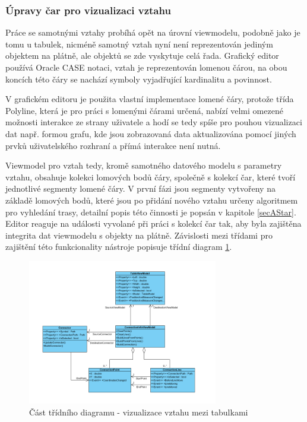 \documentclass[czech,bachelor,public,dept460,male,oneside]{diploma}
\begin{document}
		\subsubsection{Úpravy čar pro vizualizaci vztahu}
		Práce se samotnými vztahy probíhá opět na úrovní viewmodelu, podobně jako je tomu u tabulek, nicméně samotný vztah nyní není reprezentován jediným objektem na plátně, ale objektů se zde vyskytuje celá řada. Grafický editor používá Oracle CASE notaci, vztah je reprezentován lomenou čárou, na obou koncích této čáry se nachází symboly vyjadřující kardinalitu a povinnost. 
		
		V grafickém editoru je použita vlastní implementace lomené čáry, protože třída Polyline, která je pro práci s lomenými čárami určená, nabízí velmi omezené možnosti interakce ze strany uživatele a hodí se tedy spíše pro pouhou vizualizaci dat např. formou grafu, kde jsou zobrazovaná data aktualizována pomocí jiných prvků uživatelského rozhraní a přímá interakce není nutná.
		
		Viewmodel pro vztah tedy, kromě samotného datového modelu s parametry vztahu, obsahuje kolekci lomových bodů čáry, společně s kolekcí čar, které tvoří jednotlivé segmenty lomené čáry. V první fázi jsou segmenty vytvořeny na základě lomových bodů, které jsou po přidání nového vztahu určeny algoritmem pro vyhledání trasy, detailní popis této činnosti je popsán v kapitole \ref{secAStar}. Editor reaguje na události vyvolané při práci s kolekcí čar tak, aby byla zajištěna integrita dat viewmodelu s objekty na plátně. Závislosti mezi třídami pro zajištění této funkcionality nástroje popisuje třídní diagram \ref{fig:classDiagMovePolyline}.
		
		\begin{figure}[!h]
			\centering
			\includegraphics[width=0.74\textwidth]{Figures/EditorVztahy}
			\caption{Část třídního diagramu - vizualizace vztahu mezi tabulkami}
			\label{fig:classDiagMovePolyline}
		\end{figure}
		
\end{document}
